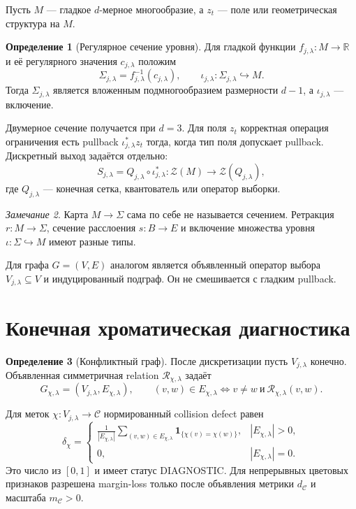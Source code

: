 \documentclass[11pt,a4paper]{article}
\theoremstyle{definition}
\newtheorem{definition}{Определение}[section]
\theoremstyle{plain}
\theoremstyle{remark}
\newtheorem{remark}[definition]{Замечание}
\newcommand{\R}{\mathbb{R}}
\newcommand{\status}[1]{\textsf{\footnotesize #1}}
\begin{document}
Пусть $M$ --- гладкое $d$-мерное многообразие, а $z_t$ --- поле или
геометрическая структура на $M$.

\begin{definition}[Регулярное сечение уровня]
Для гладкой функции $f_{j,\lambda}:M\to\R$ и её регулярного значения
$c_{j,\lambda}$ положим
\[
\Sigma_{j,\lambda}=f_{j,\lambda}^{-1}(c_{j,\lambda}),\qquad
\iota_{j,\lambda}:\Sigma_{j,\lambda}\hookrightarrow M.
\]
Тогда $\Sigma_{j,\lambda}$ является вложенным подмногообразием размерности
$d-1$, а $\iota_{j,\lambda}$ --- включение.
\end{definition}

Двумерное сечение получается при $d=3$. Для поля $z_t$ корректная операция
ограничения есть pullback $\iota_{j,\lambda}^{*}z_t$ тогда, когда тип поля
допускает pullback. Дискретный выход задаётся отдельно:
\[
S_{j,\lambda}
=Q_{j,\lambda}\circ\iota_{j,\lambda}^{*}:
\mathcal Z(M)\longrightarrow\mathcal Z(Q_{j,\lambda}),
\]
где $Q_{j,\lambda}$ --- конечная сетка, квантователь или оператор выборки.

\begin{remark}
Карта $M\to\Sigma$ сама по себе не называется сечением. Ретракция
$r:M\to\Sigma$, сечение расслоения $s:B\to E$ и включение множества уровня
$\iota:\Sigma\hookrightarrow M$ имеют разные типы.
\end{remark}

Для графа $G=(V,E)$ аналогом является объявленный оператор выбора
$V_{j,\lambda}\subseteq V$ и индуцированный подграф. Он не смешивается с
гладким pullback.

\section{Конечная хроматическая диагностика}

\begin{definition}[Конфликтный граф]
После дискретизации пусть $V_{j,\lambda}$ конечно. Объявленная симметричная
relation $\mathcal R_{\chi,\lambda}$ задаёт
\[
G_{\chi,\lambda}=(V_{j,\lambda},E_{\chi,\lambda}),\qquad
(v,w)\in E_{\chi,\lambda}\iff
v\ne w\ \text{и}\ \mathcal R_{\chi,\lambda}(v,w).
\]
\end{definition}

Для меток $\chi:V_{j,\lambda}\to\mathcal C$ нормированный collision defect
равен
\[
\delta_\chi=
\begin{cases}
\displaystyle
\frac{1}{|E_{\chi,\lambda}|}
\sum_{(v,w)\in E_{\chi,\lambda}}
\mathbf 1_{\{\chi(v)=\chi(w)\}},&
|E_{\chi,\lambda}|>0,\\[3mm]
0,&|E_{\chi,\lambda}|=0.
\end{cases}
\]
Это число из $[0,1]$ и имеет статус \status{DIAGNOSTIC}. Для непрерывных
цветовых признаков разрешена margin-loss только после объявления метрики
$d_{\mathcal C}$ и масштаба $m_{\mathcal C}>0$.
\end{document}
